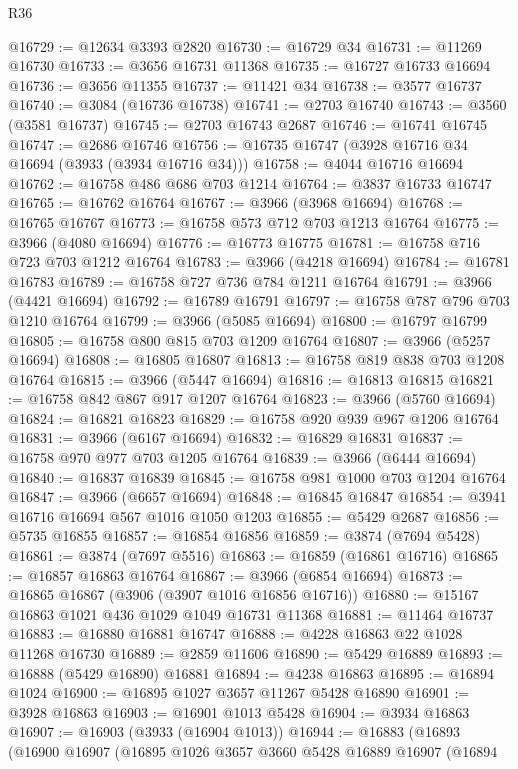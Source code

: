 \begin{lexlean}{R36}
\begin{coremodule}
@16729 := @12634 @3393 @2820
@16730 := @16729 @34
@16731 := @11269 @16730
@16733 := @3656 @16731 @11368
@16735 := @16727 @16733 @16694
@16736 := @3656 @11355
@16737 := @11421 @34
@16738 := @3577 @16737
@16740 := @3084 (@16736 @16738)
@16741 := @2703 @16740
@16743 := @3560 (@3581 @16737)
@16745 := @2703 @16743 @2687
@16746 := @16741 @16745
@16747 := @2686 @16746
@16756 := @16735 @16747 (@3928 @16716 @34 @16694 (@3933 (@3934 @16716 @34)))
@16758 := @4044 @16716 @16694
@16762 := @16758 @486 @686 @703 @1214
@16764 := @3837 @16733 @16747
@16765 := @16762 @16764
@16767 := @3966 (@3968 @16694)
@16768 := @16765 @16767
@16773 := @16758 @573 @712 @703 @1213 @16764
@16775 := @3966 (@4080 @16694)
@16776 := @16773 @16775
@16781 := @16758 @716 @723 @703 @1212 @16764
@16783 := @3966 (@4218 @16694)
@16784 := @16781 @16783
@16789 := @16758 @727 @736 @784 @1211 @16764
@16791 := @3966 (@4421 @16694)
@16792 := @16789 @16791
@16797 := @16758 @787 @796 @703 @1210 @16764
@16799 := @3966 (@5085 @16694)
@16800 := @16797 @16799
@16805 := @16758 @800 @815 @703 @1209 @16764
@16807 := @3966 (@5257 @16694)
@16808 := @16805 @16807
@16813 := @16758 @819 @838 @703 @1208 @16764
@16815 := @3966 (@5447 @16694)
@16816 := @16813 @16815
@16821 := @16758 @842 @867 @917 @1207 @16764
@16823 := @3966 (@5760 @16694)
@16824 := @16821 @16823
@16829 := @16758 @920 @939 @967 @1206 @16764
@16831 := @3966 (@6167 @16694)
@16832 := @16829 @16831
@16837 := @16758 @970 @977 @703 @1205 @16764
@16839 := @3966 (@6444 @16694)
@16840 := @16837 @16839
@16845 := @16758 @981 @1000 @703 @1204 @16764
@16847 := @3966 (@6657 @16694)
@16848 := @16845 @16847
@16854 := @3941 @16716 @16694 @567 @1016 @1050 @1203
@16855 := @5429 @2687
@16856 := @5735 @16855
@16857 := @16854 @16856
@16859 := @3874 (@7694 @5428)
@16861 := @3874 (@7697 @5516)
@16863 := @16859 (@16861 @16716)
@16865 := @16857 @16863 @16764
@16867 := @3966 (@6854 @16694)
@16873 := @16865 @16867 (@3906 (@3907 @1016 @16856 @16716))
@16880 := @15167 @16863 @1021 @436 @1029 @1049 @16731 @11368
@16881 := @11464 @16737
@16883 := @16880 @16881 @16747
@16888 := @4228 @16863 @22 @1028 @11268 @16730
@16889 := @2859 @11606
@16890 := @5429 @16889
@16893 := @16888 (@5429 @16890) @16881
@16894 := @4238 @16863
@16895 := @16894 @1024
@16900 := @16895 @1027 @3657 @11267 @5428 @16890
@16901 := @3928 @16863
@16903 := @16901 @1013 @5428
@16904 := @3934 @16863
@16907 := @16903 (@3933 (@16904 @1013))
@16944 := @16883
    (@16893
      (@16900
        @16907
        (@16895
          @1026
          @3657
          @3660
          @5428
          @16889
          @16907
          (@16894

\end{coremodule}
\end{lexlean}
